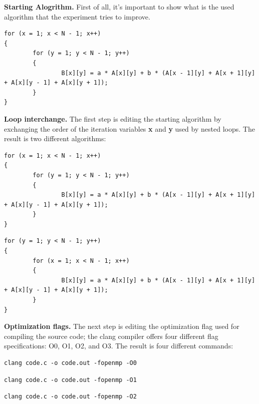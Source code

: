 \documentclass[conference]{IEEEtran}
\newcommand{\mypar}[1]{{\bf #1.}}
\begin{document}
\mypar{Starting Alogrithm}
First of all, it's important to show what is the used algorithm that the experiment tries to improve.
\begin{lstlisting}
for (x = 1; x < N - 1; x++)
{
		for (y = 1; y < N - 1; y++)
		{
				B[x][y] = a * A[x][y] + b * (A[x - 1][y] + A[x + 1][y] + A[x][y - 1] + A[x][y + 1]);
		}
}
\end{lstlisting}

\mypar{Loop interchange}
The first step is editing the starting algorithm by exchanging the order of the iteration variables \textbf{x} and \textbf{y} used by nested loops. The result is two different algorithms:

\setcounter{lstlisting}{0}
\renewcommand{\lstlistingname}{Algorithm}

\begin{lstlisting}[caption={The starting algorithm},label={lst:loop-interchange-x-y}]
for (x = 1; x < N - 1; x++)
{
		for (y = 1; y < N - 1; y++)
		{
				B[x][y] = a * A[x][y] + b * (A[x - 1][y] + A[x + 1][y] + A[x][y - 1] + A[x][y + 1]);
		}
}
\end{lstlisting}

\begin{lstlisting}[caption={A new algorithm with x and y swapped},label={lst:loop-interchange-y-x}]
for (y = 1; y < N - 1; y++)
{
		for (x = 1; x < N - 1; x++)
		{
				B[x][y] = a * A[x][y] + b * (A[x - 1][y] + A[x + 1][y] + A[x][y - 1] + A[x][y + 1]);
		}
}
\end{lstlisting}

\mypar{Optimization flags}
The next step is editing the optimization flag used for compiling the source code; the clang compiler offers four different flag specifications: O0, O1, O2, and O3. The result is four different commands:

\setcounter{lstlisting}{0}
\renewcommand{\lstlistingname}{Command}

\begin{lstlisting}[caption={Flag -O0},label={lst:optimization-flags-0}]
clang code.c -o code.out -fopenmp -O0
\end{lstlisting}

\begin{lstlisting}[caption={Flag -O1},label={lst:optimization-flags-1}]
clang code.c -o code.out -fopenmp -O1
\end{lstlisting}

\begin{lstlisting}[caption={Flag -O2},label={lst:optimization-flags-2}]
clang code.c -o code.out -fopenmp -O2
\end{lstlisting}
\end{document}
